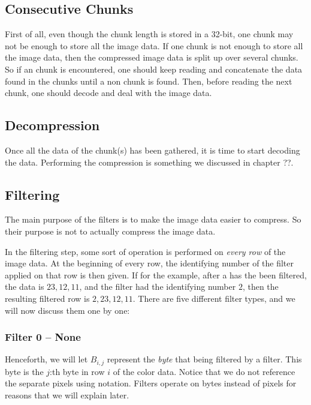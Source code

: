 \subsection{Consecutive Chunks}

First of all, even though the chunk length is stored in a 32-bit, one
chunk may not be enough to store all the image data. If one chunk is
not enough to store all the image data, then the compressed image data
is split up over several \IDAT chunks. So if an \IDAT chunk is
encountered, one should keep reading and concatenate the data found in
the \IDAT chunks until a non \IDAT chunk is found. Then, before
reading the next chunk, one should decode and deal with the image
data.

\subsection{Decompression}
\label{sec:png-dec}

Once all the data of the \IDAT chunk(s) has been gathered, it is time
to start decoding the data. Performing the compression is something we
discussed in chapter ??. 

\subsection{Filtering}
\label{sec:png-filters}

The main purpose of the filters is to make the image data easier to
compress. So their purpose is not to actually compress the image data.

In the filtering step, some sort of operation is performed on
\textit{every row} of the image data. At the beginning of every row,
the identifying number of the filter applied on that row is then
given. If for the example, after a has the been filtered, the data is
$23,12,11$, and the filter had the identifying number $2$, then the
resulting filtered row is $2,23,12,11$. There are five different
filter types, and we will now discuss them one by one:

\subsubsection{Filter 0 -- None}

Henceforth, we will let $B_{i,j}$ represent the \textit{byte} that
being filtered by a filter. This byte is the $j$:th byte in row $i$ of
the color data. Notice that we do not reference the separate pixels
using notation. Filters operate on bytes instead of pixels for reasons
that we will explain later.



